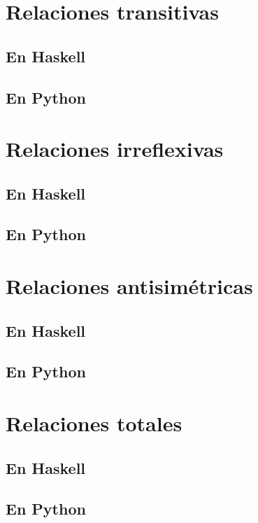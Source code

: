 \documentclass[a4paper,12pt,twoside]{book}
\begin{document}
\section{Relaciones transitivas}
\subsection{En Haskell}
\subsection{En Python}

\section{Relaciones irreflexivas}
\subsection{En Haskell}
\subsection{En Python}

\section{Relaciones antisimétricas}
\subsection{En Haskell}
\subsection{En Python}

\section{Relaciones totales}
\subsection{En Haskell}
\subsection{En Python}
\end{document}
